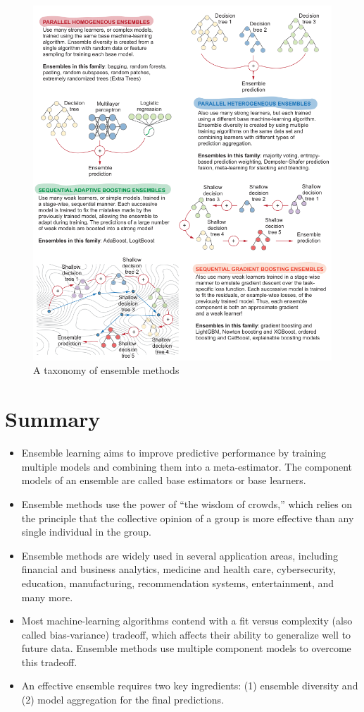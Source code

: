 \begin{figure}
    \centering
    \includegraphics{../Figures/A taxonomy of ensemble methods.png}
    \caption{A taxonomy of ensemble methods}
\end{figure}

\section{Summary}

\begin{itemize}
    \item  Ensemble learning aims to improve predictive performance by training multiple models and combining them into a meta-estimator. The component models
          of an ensemble are called base estimators or base learners.
    \item  Ensemble methods use the power of “the wisdom of crowds,” which relies on
          the principle that the collective opinion of a group is more effective than any
          single individual in the group.
    \item  Ensemble methods are widely used in several application areas, including financial and business analytics, medicine and health care, cybersecurity, education,
          manufacturing, recommendation systems, entertainment, and many more.
    \item  Most machine-learning algorithms contend with a fit versus complexity (also
          called bias-variance) tradeoff, which affects their ability to generalize well to
          future data. Ensemble methods use multiple component models to overcome
          this tradeoff.
    \item  An effective ensemble requires two key ingredients: (1) ensemble diversity and
          (2) model aggregation for the final predictions.
\end{itemize}